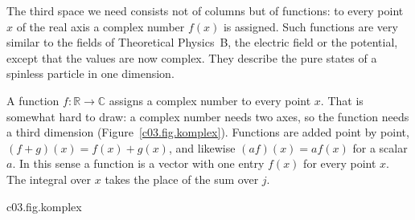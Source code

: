 The third space we need consists not of columns but of functions: to every point $x$ of the
real axis a complex number $f(x)$ is assigned. Such functions are very similar to the fields
of Theoretical Physics~B, the electric field or the potential, except that the values are now
complex. They describe the pure states of a spinless particle in one
dimension.

\begin{vertiefung}[id=c03.v2,
    titel={Functions as vectors},
    wozu={Functions can be added and multiplied by numbers like vectors. Here they get an
      inner product, with an integral in place of the sum (with one reservation, which the
      Foundations resolve), and the same admission condition as the columns in
      $\elltwo$.},
    voraussetzung={Section~\ref{c03.s2}; improper integrals. Block~\ref{c03.v1} helps but is
      not needed. The core up to Chapter~4 does not need this block; Chapter~5 introduces the
      space in the core once more.},
    zurueck={Square-integrable functions form a vector space on which the integral
      $\braket{f}{g} = \int f^*(x)\, g(x)\, \dd x$ is defined; it becomes a true inner
      product only once functions that agree almost everywhere are identified. The constant function
      $1$ does not belong to it.}]
  A function $f\colon \mathbb{R} \to \mathbb{C}$ assigns a complex number to every point
  $x$. That is somewhat hard to draw: a complex number needs two axes, so the function needs
  a third dimension (Figure~\ref{c03.fig.komplex}). Functions are added point by point,
  $(f + g)(x) = f(x) + g(x)$, and likewise $(af)(x) = a f(x)$ for a scalar $a$. In this sense
  a function is a vector with one entry $f(x)$ for every point $x$. The integral over $x$
  takes the place of the sum over $j$.

  \begin{tpcfigure}{c03.fig.komplex}
    \caption{A complex-valued function needs three dimensions. Drawn is
      $f(x) = e^{-x^2/2}\, e^{2ix}$ for $-3 \leq x \leq 3$: to every $x$ belongs the point
      $(\operatorname{Re} f(x), \operatorname{Im} f(x))$ of a complex plane standing
      perpendicular to the $x$-axis. The curve winds around the $x$-axis; its distance from
      the axis is $\abs{f(x)} = e^{-x^2/2}$ (thin circles at $x = -1, 0, 1$; thin spokes join the axis to the curve). Dashed is the real part alone,
      in the plane $\operatorname{Im} f = 0$: the usual drawing, which lacks half of the
      information.}
  \end{tpcfigure}


\end{vertiefung}
